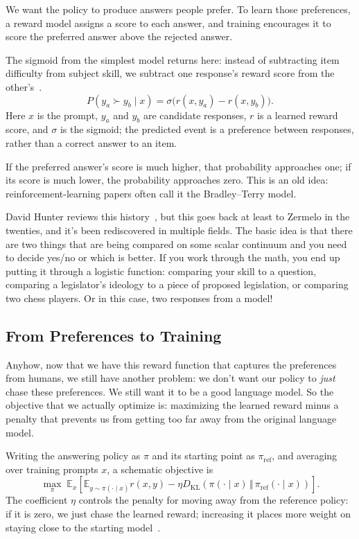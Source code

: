 We want the policy to produce answers people prefer.  To learn those preferences, a reward model assigns a score to each answer, and training encourages it to score the preferred answer above the rejected answer.

The sigmoid from the simplest  model returns here: instead of subtracting item difficulty from subject skill, we subtract one response's reward score from the other's~\citep{hunter-bradley-terry-04}.
\begin{equation}
  P(y_a \succ y_b \mid x) = \sigma\bigl(r(x,y_a)-r(x,y_b)\bigr).
  \label{eq:leaderboards:preference}
\end{equation}
Here $x$ is the prompt, $y_a$ and $y_b$ are candidate responses, $r$ is a learned reward score, and $\sigma$ is the sigmoid; the predicted event is a preference between responses, rather than a correct answer to an item.

If the preferred answer's score is much higher, that probability approaches one; if its score is much lower, the probability approaches zero.  This is an old idea: reinforcement-learning papers often call it the Bradley--Terry model.

David Hunter reviews this history~\citep{hunter-bradley-terry-04}, but this goes back at least to Zermelo in the twenties, and it's been rediscovered in multiple fields.  The basic idea is that there are two things that are being compared on some scalar continuum and you need to decide yes/no or which is better.  If you work through the math, you end up putting it through a logistic function: comparing your skill to a question, comparing a legislator's ideology to a piece of proposed legislation, or comparing two chess players.  Or in this case, two responses from a model!

\subsection{From Preferences to Training}
\label{sec:leaderboards:rlhf}

Anyhow, now that we have this reward function that captures the preferences from humans, we still have another problem: we don't want our policy to \emph{just} chase these preferences.  We still want it to be a good language model.  So the objective that we actually optimize is: maximizing the learned reward minus a penalty that prevents us from getting too far away from the original language model.

Writing the answering policy as $\pi$ and its starting point as $\pi_{\mathrm{ref}}$, and averaging over training prompts $x$, a schematic objective is
\begin{equation}
  \max_{\pi}\;\mathbb{E}_{x}\left[
    \mathbb{E}_{y\sim\pi(\cdot\mid x)} r(x,y)
    - \eta D_{\mathrm{KL}}\!\left(\pi(\cdot\mid x)\,\Vert\,\pi_{\mathrm{ref}}(\cdot\mid x)\right)
  \right].
  \label{eq:leaderboards:rlhf}
\end{equation}
The coefficient $\eta$ controls the penalty for moving away from the reference policy: if it is zero, we just chase the learned reward; increasing it places more weight on staying close to the starting model~\citep{ouyang-22}.

